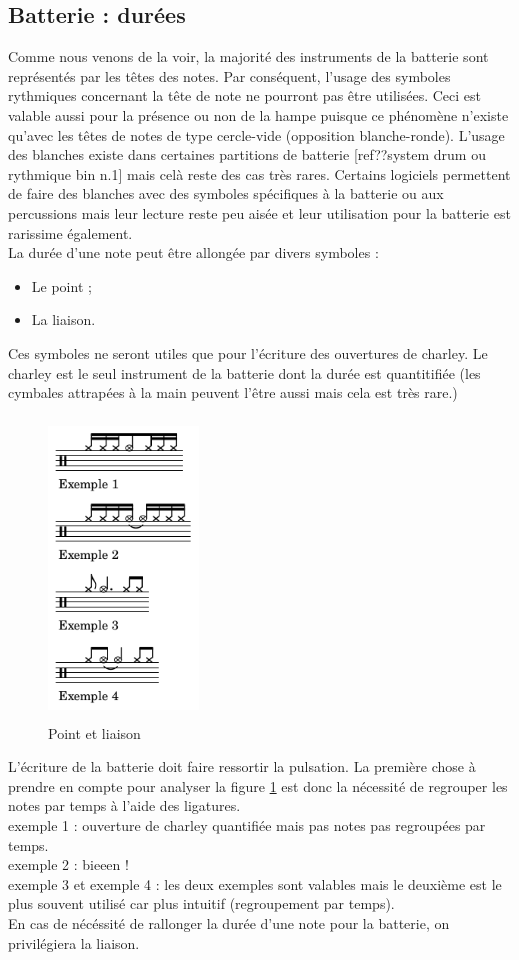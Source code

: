 \subsection*{Batterie : durées}
\label{hho}
Comme nous venons de la voir, la majorité des instruments de la batterie sont représentés par les têtes des notes. Par conséquent, l’usage des symboles rythmiques concernant la tête de note ne pourront pas être utilisées. Ceci est valable aussi pour la présence ou non de la hampe puisque ce phénomène n’existe qu’avec les têtes de notes de type cercle-vide (opposition blanche-ronde). L’usage des blanches existe dans certaines partitions de batterie [ref??system drum ou rythmique bin n.1] mais celà reste des cas très rares. Certains logiciels permettent de faire des blanches avec des symboles spécifiques à la batterie ou aux percussions mais leur lecture reste peu aisée et leur utilisation pour la batterie est rarissime également.\\
La durée d’une note peut être allongée par divers symboles :
\begin{itemize}
	\item Le point ;
	\item La liaison.
\end{itemize}
Ces symboles ne seront utiles que pour l’écriture des ouvertures de charley. Le charley est le seul instrument de la batterie dont la durée est quantitifiée (les cymbales attrapées à la main peuvent l’être aussi mais cela est très rare.)\newpage
\begin{figure}[h]
	\centering
	\includegraphics[height=80mm, width=40mm]{z_images/3_methodes/point_et_liaison.png}
	\caption{Point et liaison}
	\label{point_liaison}
\end{figure}
L’écriture de la batterie doit faire ressortir la pulsation. La première chose à prendre en compte pour analyser la figure \ref{point_liaison} est donc la nécessité de regrouper les notes par temps à l’aide des ligatures.\\
exemple 1 : ouverture de charley quantifiée mais pas notes pas regroupées par temps.\\
exemple 2 : bieeen !\\
exemple 3 et exemple 4 : les deux exemples sont valables mais le deuxième est le plus souvent utilisé car plus intuitif (regroupement par temps).\\
En cas de nécéssité de rallonger la durée d’une note pour la batterie, on privilégiera la liaison.
